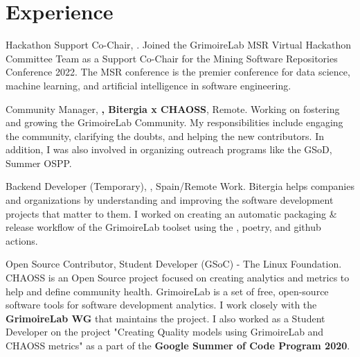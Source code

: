 \documentclass[11pt,a4paper,sans]{moderncv} %
\begin{document}

\section{Experience}

{
    Hackathon Support Co-Chair, \textbf{}.
    \newline
    Joined the GrimoireLab MSR Virtual Hackathon Committee Team as a Support Co-Chair for the Mining Software Repositories Conference 2022. The MSR conference is the premier conference for data science, machine learning, and artificial intelligence in software engineering.
}

{
    Community Manager, \textbf{, Bitergia x CHAOSS}, Remote.
    \newline
    Working on fostering and growing the GrimoireLab Community. My responsibilities include engaging the community, clarifying the doubts, and helping the new contributors. In addition, I was also involved in organizing outreach programs like the GSoD, Summer OSPP.
}

{
    Backend Developer (Temporary), \textbf{}, Spain/Remote Work.
    \newline
    Bitergia helps companies and organizations by understanding and improving the software development projects that matter to them. I worked on creating an automatic packaging \& release workflow of the GrimoireLab toolset using the , poetry, and github actions.
}

{
    Open Source Contributor, Student Developer (GSoC) \textbf{} - The Linux Foundation.
    \newline
    CHAOSS is an Open Source project focused on creating analytics and metrics to help and define community health. GrimoireLab is a set of free, open-source software tools for software development analytics. I work closely with the \textbf{GrimoireLab WG} that maintains the project.
    \newline
    I also worked as a Student Developer on the project "Creating Quality models using GrimoireLab and CHAOSS metrics" as a part of the \textbf{Google Summer of Code Program 2020}.
}
\end{document}
